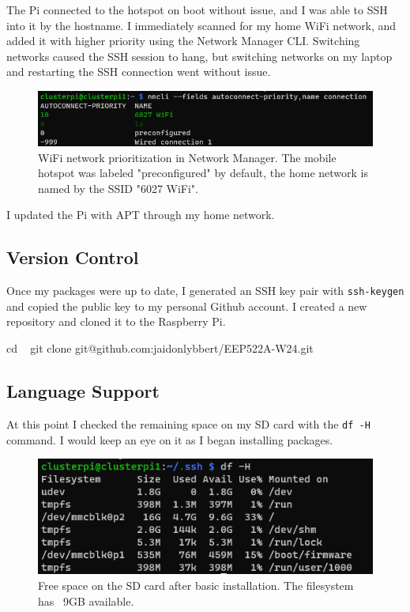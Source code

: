 \documentclass[12pt]{article}
\begin{document}
The Pi connected to the hotspot on boot without issue, and I was able to SSH into it by the hostname. I immediately scanned for my home WiFi network, and added it with higher priority using the Network Manager CLI. Switching networks caused the SSH session to hang, but switching networks on my laptop and restarting the SSH connection went without issue.

\begin{figure}[h]
\centering
\includegraphics[width=1.0\textwidth]{network-config.png} %
\caption{WiFi network prioritization in Network Manager. The mobile hotspot was labeled "preconfigured" by default, the home network is named by the SSID "6027 WiFi".}
\label{fig:networkpriority}
\end{figure}

I updated the Pi with APT through my home network. 

\subsection{Version Control}

Once my packages were up to date, I generated an SSH key pair with \verb|ssh-keygen| and copied the public key to my personal Github account. I created a new repository \cite{lybbert2024classwork} and cloned it to the Raspberry Pi. 

cd ~
git clone git@github.com:jaidonlybbert/EEP522A-W24.git

\subsection{Language Support}

At this point I checked the remaining space on my SD card with the \verb|df -H| command. I would keep an eye on it as I began installing packages.

\begin{figure}[h]
\centering
\includegraphics[width=1.0\textwidth]{freespace.png} %
\caption{Free space on the SD card after basic installation. The filesystem has ~9GB available.}
\label{fig:freespace}
\end{figure}
\end{document}
